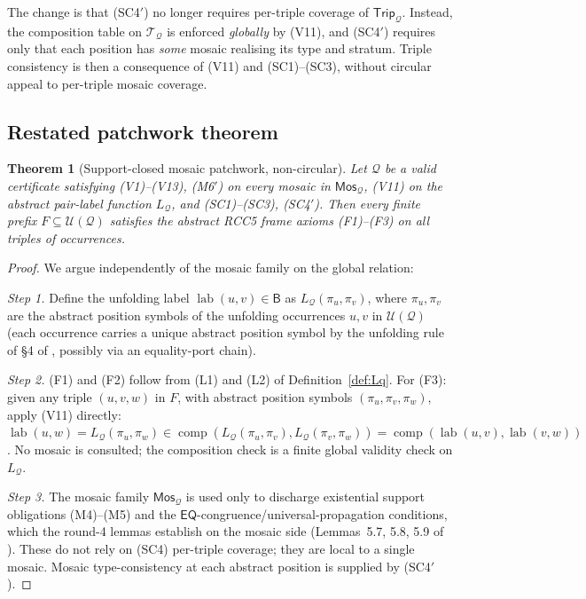 \documentclass[11pt]{article}
\newtheorem{theorem}{Theorem}[section]
\theoremstyle{definition}
\theoremstyle{remark}
\newcommand{\EQ}{\mathsf{EQ}}
\newcommand{\Base}{\mathsf{B}}
\newcommand{\comp}{\operatorname{comp}}
\newcommand{\Mos}{\mathsf{Mos}}
\newcommand{\Trip}{\mathsf{Trip}}
\newcommand{\Q}{\mathcal{Q}}
\newcommand{\U}{\mathcal{U}}
\newcommand{\T}{\mathcal{T}}
\newcommand{\lab}{\operatorname{lab}}
\begin{document}
The change is that (SC4$'$) no longer requires per-triple coverage
of $\Trip_\Q$.  Instead, the composition table on $\T_\Q$ is
enforced \emph{globally} by (V11), and (SC4$'$) requires only that
each position has \emph{some} mosaic realising its type and
stratum.  Triple consistency is then a consequence of (V11) and
(SC1)--(SC3), without circular appeal to per-triple mosaic
coverage.

\subsection{Restated patchwork theorem}

\begin{theorem}[Support-closed mosaic patchwork, non-circular]\label{thm:patchwork-v3}
Let $\Q$ be a valid certificate satisfying (V1)--(V13), (M6$'$) on
every mosaic in $\Mos_\Q$, (V11) on the abstract pair-label function
$L_\Q$, and (SC1)--(SC3), (SC4$'$).  Then every finite prefix
$F\subseteq\U(\Q)$ satisfies the abstract RCC5 frame axioms
(F1)--(F3) on all triples of occurrences.
\end{theorem}

\begin{proof}
We argue independently of the mosaic family on the global
relation:

\emph{Step 1.}  Define the unfolding label $\lab(u,v)\in\Base$ as
$L_\Q(\pi_u,\pi_v)$, where $\pi_u,\pi_v$ are the abstract position
symbols of the unfolding occurrences $u,v$ in $\U(\Q)$ (each
occurrence carries a unique abstract position symbol by the
unfolding rule of \S4 of \cite{GPT55Repaired}, possibly via an
equality-port chain).

\emph{Step 2.}  (F1) and (F2) follow from (L1) and (L2) of
Definition~\ref{def:Lq}.  For (F3):  given any triple $(u,v,w)$ in
$F$, with abstract position symbols
$(\pi_u,\pi_v,\pi_w)$, apply (V11) directly:
$\lab(u,w)=L_\Q(\pi_u,\pi_w)\in\comp(L_\Q(\pi_u,\pi_v),L_\Q(\pi_v,\pi_w))
=\comp(\lab(u,v),\lab(v,w))$.  No mosaic is consulted; the
composition check is a finite global validity check on $L_\Q$.

\emph{Step 3.}  The mosaic family $\Mos_\Q$ is used only to discharge
existential support obligations (M4)--(M5) and the
$\EQ$-congruence/universal-propagation conditions, which the
round-4 lemmas establish on the mosaic side (Lemmas~5.7, 5.8, 5.9 of
\cite{GPT55Repaired}).  These do not rely on (SC4) per-triple
coverage; they are local to a single mosaic.  Mosaic
type-consistency at each abstract position is supplied by (SC4$'$).
\end{proof}
\end{document}
